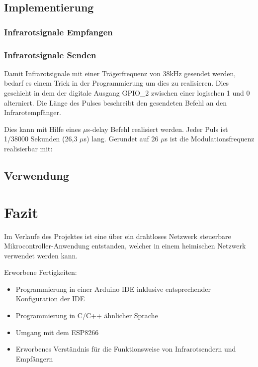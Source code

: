 \subsection{Implementierung}

\subsubsection{Infrarotsignale Empfangen}
\subsubsection{Infrarotsignale Senden}
Damit Infrarotsignale mit einer Trägerfrequenz von 38kHz gesendet werden, bedarf es einem Trick in der Programmierung um dies zu realisieren.
Dies geschieht in dem der digitale Ausgang GPIO\_2 zwischen einer logischen 1 und 0 alterniert.
Die Länge des Pulses beschreibt den gesendeten Befehl an den Infrarotempfänger.

Dies kann mit Hilfe eines $\mu$s-delay Befehl realisiert werden.
Jeder Puls ist 1/38000 Sekunden (26,3 $\mu$s) lang.
Gerundet auf 26 $\mu$s ist die Modulationsfrequenz realisierbar mit:

\subsection{Verwendung}
\section{Fazit}

Im Verlaufe des Projektes ist eine über ein drahtloses Netzwerk steuerbare Mikrocontroller-Anwendung entstanden, welcher in einem heimischen Netzwerk verwendet werden kann.

Erworbene Fertigkeiten:
\begin{itemize}
	\item Programmierung in einer Arduino IDE inklusive entsprechender Konfiguration der IDE
	\item Programmierung in C/C++ ähnlicher Sprache
	\item Umgang mit dem ESP8266
	\item Erworbenes Verständnis für die Funktionsweise von Infrarotsendern und Empfängern
\end{itemize} 

